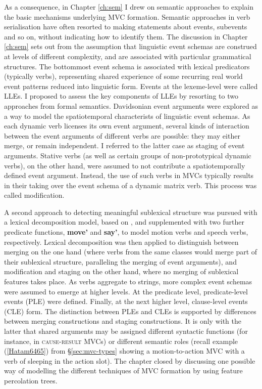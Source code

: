 As a consequence, in Chapter \ref{ch:sem} I drew on semantic approaches to explain the basic mechanisms underlying MVC formation. Semantic approaches in verb serialisation have often resorted to making statements about events, subevents and so on, without indicating how to identify them. The discussion in Chapter \ref{ch:sem} sets out from the assumption that linguistic event schemas are construed at levels of different complexity, and are associated with particular grammatical structures. The bottommost event schema is associated with lexical predicators (typically verbs), representing shared experience of some recurring real world event patterns reduced into linguistic form. Events at the lexeme-level were called LLEs. I proposed to assess the key components of LLEs by resorting to two approaches from formal semantics. Davidsonian event arguments were explored as a way to model the spatiotemporal characterists of linguistic event schemas. As each dynamic verb licenses its own event argument, several kinds of interaction between the event arguments of different verbs are possible: they may either merge, or remain independent. I referred to the latter case as staging of event arguments. Stative verbs (as well as certain groups of non-prototypical dynamic verbs), on the other hand, were assumed to not contribute a spatiotemporally defined event argument. Instead, the use of such verbs in MVCs typically results in their taking over the event schema of a dynamic matrix verb. This process was called modification. 

A second approach to detecting meaningful sublexical structure was pursued with a lexical decomposition model, based on \citet{van1997syntax}, and supplemented with two further predicate functions, \textbf{move'} and \textbf{say'}, to model motion verbs and speech verbs, respectively. Lexical decomposition was then applied to distinguish between merging on the one hand (where verbs from the same classes would merge part of their sublexical structure, paralleling the merging of event arguments), and modification and staging on the other hand, where no merging of sublexical features takes place. As verbs aggregate to strings, more complex event schemas were assumed to emerge at higher levels. At the predicate level, predicate-level events (PLE) were defined. Finally, at the next higher level, clause-level events (CLE) form. The distinction between PLEs and CLEs is supported by differences between merging constructions and staging constructions. It is only with the latter that shared arguments may be assigned different syntactic functions (for instance, in \textsc{cause-result} MVCs) or different semantic roles (recall example (\ref{Hatam6465}) from §\ref{sec:mvc-types} showing a motion-to-action MVC with a verb of sleeping in the action slot). The chapter closed by discussing one possible way of modelling the different techniques of MVC formation by using feature percolation trees.

